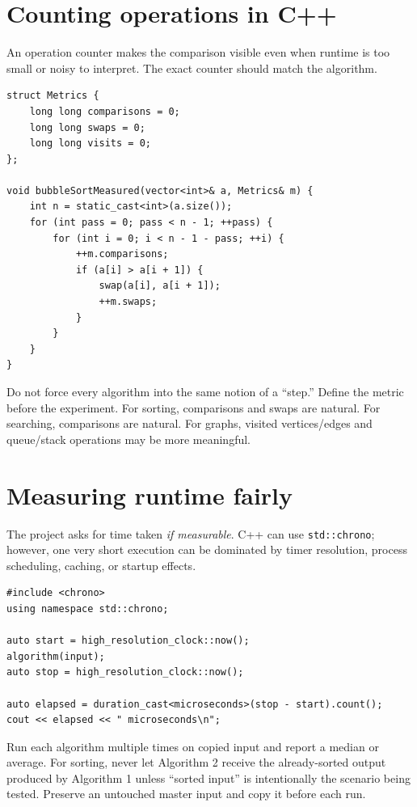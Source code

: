 \section{Counting operations in C++}

An operation counter makes the comparison visible even when runtime is too small or noisy to interpret. The exact counter should match the algorithm.

\begin{lstlisting}
struct Metrics {
    long long comparisons = 0;
    long long swaps = 0;
    long long visits = 0;
};

void bubbleSortMeasured(vector<int>& a, Metrics& m) {
    int n = static_cast<int>(a.size());
    for (int pass = 0; pass < n - 1; ++pass) {
        for (int i = 0; i < n - 1 - pass; ++i) {
            ++m.comparisons;
            if (a[i] > a[i + 1]) {
                swap(a[i], a[i + 1]);
                ++m.swaps;
            }
        }
    }
}
\end{lstlisting}

\begin{keyidea}
Do not force every algorithm into the same notion of a ``step.'' Define the metric before the experiment. For sorting, comparisons and swaps are natural. For searching, comparisons are natural. For graphs, visited vertices/edges and queue/stack operations may be more meaningful.
\end{keyidea}

\section{Measuring runtime fairly}

The project asks for time taken \emph{if measurable}. C++ can use \texttt{std::chrono}; however, one very short execution can be dominated by timer resolution, process scheduling, caching, or startup effects.

\begin{lstlisting}
#include <chrono>
using namespace std::chrono;

auto start = high_resolution_clock::now();
algorithm(input);
auto stop = high_resolution_clock::now();

auto elapsed = duration_cast<microseconds>(stop - start).count();
cout << elapsed << " microseconds\n";
\end{lstlisting}

\begin{recommendedworkflow}
Run each algorithm multiple times on copied input and report a median or average. For sorting, never let Algorithm 2 receive the already-sorted output produced by Algorithm 1 unless ``sorted input'' is intentionally the scenario being tested. Preserve an untouched master input and copy it before each run.
\end{recommendedworkflow}

